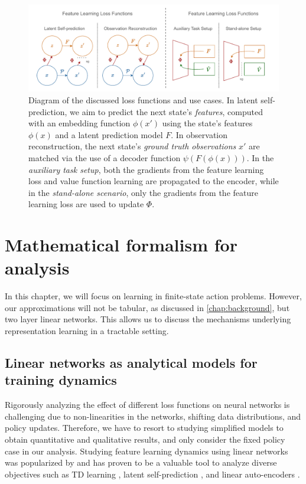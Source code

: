 \begin{figure}
    \centering
    \includegraphics[width=\textwidth]{illustrations/thesis_understanding_overview.pdf}
    \caption{Diagram of the discussed loss functions and use cases. In latent self-prediction, we aim to predict the next state's \emph{features}, computed with an embedding function $\phi(x')$ using the state's features $\phi(x)$ and a latent prediction model $F$. In observation reconstruction, the next state's \emph{ground truth observations} $x'$ are matched via the use of a decoder function $\psi(F(\phi(x)))$. In the \emph{auxiliary task setup}, both the gradients from the feature learning loss and value function learning are propagated to the encoder, while in the \emph{stand-alone scenario}, only the gradients from the feature learning loss are used to update $\Phi$.}
    \label{fig:understanding:losses}
\end{figure}

\section{Mathematical formalism for analysis}
In this chapter, we will focus on learning in finite-state action problems.
However, our approximations will not be tabular, as discussed in \autoref{chap:background}, but two layer linear networks.
This allows us to discuss the mechanisms underlying representation learning in a tractable setting.

\subsection{Linear networks as analytical models for training dynamics}
\label{sec:understanding:background}

Rigorously analyzing the effect of different loss functions on neural networks is challenging due to non-linearities in the networks, shifting data distributions, and policy updates.
Therefore, we have to resort to studying simplified models to obtain quantitative and qualitative results, and only consider the fixed policy case in our analysis.
Studying feature learning dynamics using linear networks was popularized by \textcite{saxe2014exact} and has proven to be a valuable tool to analyze diverse objectives such as TD learning \parencite{tang2023towards,lelan2023bootstrapped}, latent self-prediction \parencite{tian2021understanding,tang2022understanding}, and linear auto-encoders \parencite{pretorius2018learning,bao2020regularized}.

